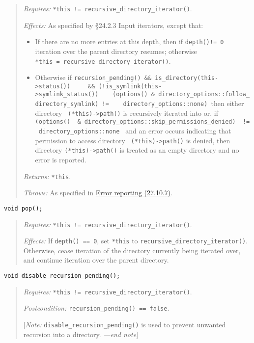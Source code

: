\begin{quote}
\emph{Requires:} \texttt{*this\ !=\ recursive\_directory\_iterator()}.

\emph{Effects:} As specified by §24.2.3 Input iterators, except that:

\begin{itemize}
\tightlist
\item
  If there are no more entries at this depth, then if
  \texttt{depth()!=\ 0} iteration over the parent directory resumes;
  otherwise \texttt{*this\ =\ recursive\_directory\_iterator()}.
\item
  Otherwise if
  \texttt{recursion\_pending()\ \&\&\ is\_directory(this-\textgreater{}status())\ \ ~\ \ \&\&\ (!is\_symlink(this-\textgreater{}symlink\_status())\ ~\ \textbar{}\textbar{}\ (options()\ \&\ directory\_options::follow\_directory\_symlink)\ !=\ \ \ \ directory\_options::none)\ }then
  either directory \texttt{\ (*this)-\textgreater{}path()} is
  recursively iterated into or, if
  \texttt{(options()\ \ \&\ directory\_options::skip\_permissions\_denied)\ ~!=\ directory\_options::none\ }
  and an error occurs indicating that permission to access directory
  \texttt{\ (*this)-\textgreater{}path()} is denied, then directory
  \texttt{(*this)-\textgreater{}path()} is treated as an empty directory
  and no error is reported.
\end{itemize}

\emph{Returns:} \texttt{*this}.

\emph{Throws:} As specified in \hyperref[Error-reporting]{Error
reporting (27.10.7)}.
\end{quote}

\begin{verbatim}
void pop();
\end{verbatim}

\begin{quote}
\emph{Requires:} \texttt{*this\ !=\ recursive\_directory\_iterator()}.

\emph{Effects:} If \texttt{depth()\ ==\ 0}, set \texttt{*this} to
\texttt{recursive\_directory\_iterator()}. Otherwise, cease iteration of
the directory currently being iterated over, and continue iteration over
the parent directory.
\end{quote}

\begin{verbatim}
void disable_recursion_pending();
\end{verbatim}

\begin{quote}
\emph{Requires:} \texttt{*this\ !=\ recursive\_directory\_iterator()}.

\emph{Postcondition:} \texttt{recursion\_pending()\ ==\ false}.

{[}\emph{Note:} \texttt{disable\_recursion\_pending}\texttt{()} is used
to prevent unwanted recursion into a directory. \emph{---end note}{]}
\end{quote}

